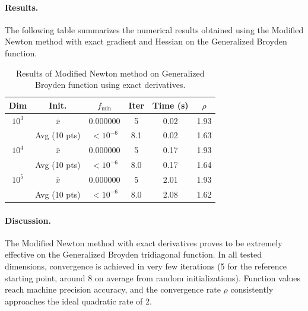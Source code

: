 \documentclass[a4paper,12pt]{article}
\begin{document}
	\paragraph{Results.}
	The following table summarizes the numerical results obtained using the Modified Newton method with exact gradient and Hessian on the Generalized Broyden function.
	
	\begin{table}[htbp]
		\centering
		\caption{Results of Modified Newton method on Generalized Broyden function using exact derivatives.}
		\renewcommand{\arraystretch}{1.2}
		\begin{tabular}{|c|c|c|c|c|c|}
			\hline
			\textbf{Dim} & \textbf{Init.} & \textbf{$f_{\min}$} & \textbf{Iter} & \textbf{Time (s)} & \textbf{$\rho$} \\
			\hline
			$10^3$   & $\bar{x}$       & $0.000000$  & 5   & 0.02 & 1.93 \\
			& Avg (10 pts)    & $<10^{-6}$  & 8.1 & 0.02 & 1.63 \\
			\hline
			$10^4$   & $\bar{x}$       & $0.000000$  & 5   & 0.17 & 1.93 \\
			& Avg (10 pts)    & $<10^{-6}$  & 8.0 & 0.17 & 1.64 \\
			\hline
			$10^5$   & $\bar{x}$       & $0.000000$  & 5   & 2.01 & 1.93 \\
			& Avg (10 pts)    & $<10^{-6}$  & 8.0 & 2.08 & 1.62 \\
			\hline
		\end{tabular}
		\label{tab:gb_exact_all}
	\end{table}
	
	\paragraph{Discussion.}
	The Modified Newton method with exact derivatives proves to be extremely effective on the Generalized Broyden tridiagonal function. In all tested dimensions, convergence is achieved in very few iterations (5 for the reference starting point, around 8 on average from random initializations). Function values reach machine precision accuracy, and the convergence rate \(\rho\) consistently approaches the ideal quadratic rate of 2.
	
\end{document}
